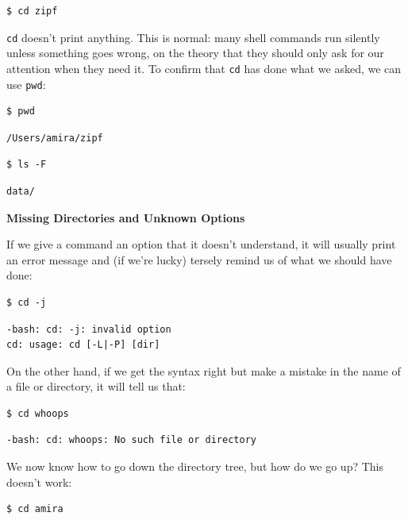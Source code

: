 \documentclass[
]{krantz}
\renewenvironment{quote}{\begin{VF}}{\end{VF}}
\begin{document}
\begin{verbatim}
$ cd zipf
\end{verbatim}

\texttt{cd} doesn't print anything.
This is normal:
many shell commands run silently unless something goes wrong,
on the theory that they should only ask for our attention when they need it.
To confirm that \texttt{cd} has done what we asked,
we can use \texttt{pwd}:

\begin{verbatim}
$ pwd
\end{verbatim}

\begin{verbatim}
/Users/amira/zipf
\end{verbatim}

\begin{verbatim}
$ ls -F
\end{verbatim}

\begin{verbatim}
data/
\end{verbatim}

\begin{quote}
\textbf{Missing Directories and Unknown Options}

If we give a command an option that it doesn't understand,
it will usually print an error message and (if we're lucky)
tersely remind us of what we should have done:

\begin{verbatim}
$ cd -j
\end{verbatim}

\begin{verbatim}
-bash: cd: -j: invalid option
cd: usage: cd [-L|-P] [dir]
\end{verbatim}

On the other hand,
if we get the syntax right but make a mistake in the name of a file or directory,
it will tell us that:

\begin{verbatim}
$ cd whoops
\end{verbatim}

\begin{verbatim}
-bash: cd: whoops: No such file or directory
\end{verbatim}
\end{quote}

We now know how to go down the directory tree,
but how do we go up?
This doesn't work:

\begin{verbatim}
$ cd amira
\end{verbatim}
\end{document}
